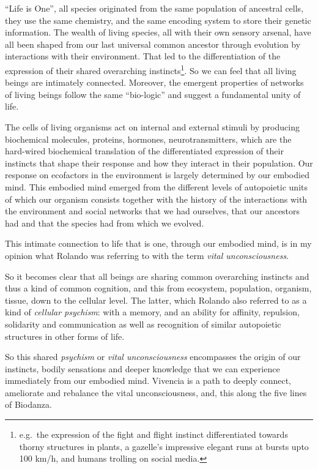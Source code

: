 \documentclass[
  11pt,
]{book}
\begin{document}
``Life is One'', all species originated from the same population of ancestral cells, they use the same chemistry, and the same encoding system to store their genetic information.
The wealth of living species, all with their own sensory arsenal, have all been shaped from our last universal common ancestor through evolution by interactions with their environment.
That led to the differentiation of the expression of their shared overarching instincts\footnote{e.g.~the expression of the fight and flight instinct differentiated towards thorny structures in plants, a gazelle's impressive elegant runs at bursts upto 100 km/h, and humans trolling on social media.}. So we can feel that all living beings are intimately connected. Moreover, the emergent properties of networks of living beings follow the same ``bio-logic'' and suggest a fundamental unity of life.

The cells of living organisms act on internal and external stimuli by producing biochemical molecules, proteins, hormones, neurotransmitters, which are the hard-wired biochemical translation of the differentiated expression of their instincts that shape their response and how they interact in their population.
Our response on ecofactors in the environment is largely determined by our embodied mind. This embodied mind emerged from the different levels of autopoietic units of which our organism consists together with the history of the interactions with the environment and social networks that we had ourselves, that our ancestors had and that the species had from which we evolved.

This intimate connection to life that is one, through our embodied mind, is in my opinion what Rolando was referring to with the term \emph{vital unconsciousness}.

So it becomes clear that all beings are sharing common overarching instincts and thus a kind of common cognition, and this from ecosystem, population, organism, tissue, down to the cellular level. The latter, which Rolando also referred to as a kind of \emph{cellular psychism}: with a memory, and an ability for affinity, repulsion, solidarity and communication as well as recognition of similar autopoietic structures in other forms of life.

So this shared \emph{psychism} or \emph{vital unconsciousness} encompasses the origin of our instincts, bodily sensations and deeper knowledge that we can experience immediately from our embodied mind. Vivencia is a path to deeply connect, ameliorate and rebalance the vital unconsciousness, and, this along the five lines of Biodanza.
\end{document}
